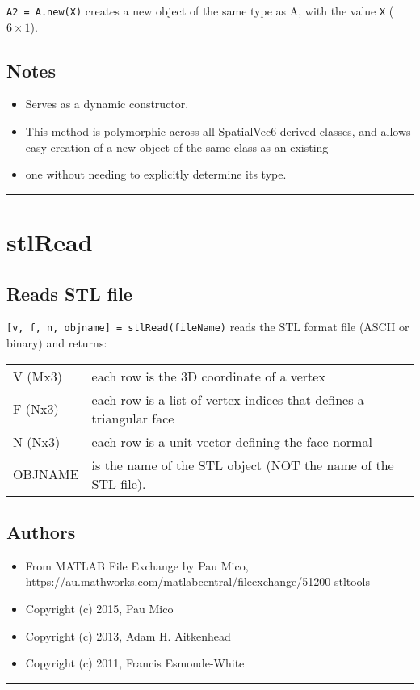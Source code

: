 \texttt{A2 = A.new(X)} creates a new object of the same type as A, with the value
\texttt{X} ($6 \times 1$).


\subsection*{Notes}
\begin{itemize}
  \item Serves as a dynamic constructor.
  \item This method is polymorphic across all SpatialVec6 derived classes, and     allows easy creation of a new object of the same class as an existing
  \item one without needing to explicitly determine its type.
\end{itemize}
\vspace{1.5ex}\rule{\textwidth}{1mm}

\hypertarget{stlRead}{\section*{stlRead}}
\subsection*{Reads STL file}


\texttt{[v, f, n, objname] = stlRead(fileName)} reads the STL format file (ASCII or
binary) and returns:

\begin{longtable}{lp{120mm}}
V (Mx3) & each row is the 3D coordinate of a vertex\\ 
F (Nx3) & each row is a list of vertex indices that defines a triangular face\\ 
N (Nx3) & each row is a unit-vector defining the face normal\\ 
OBJNAME & is the name of the STL object (NOT the name of the STL file).\\ 
\end{longtable}\vspace{1ex}

\subsection*{Authors}
\begin{itemize}
  \item From MATLAB File Exchange by Pau Mico, \url{https://au.mathworks.com/matlabcentral/fileexchange/51200-stltools}
  \item Copyright (c) 2015, Pau Mico
  \item Copyright (c) 2013, Adam H. Aitkenhead
  \item Copyright (c) 2011, Francis Esmonde-White
\end{itemize}
\vspace{1.5ex}\rule{\textwidth}{1mm}

